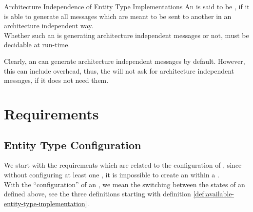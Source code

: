 \documentclass[a4paper, 12pt]{book}
\begin{document}
\begin{definition*}{Architecture Independence of Entity Type Implementations}
  An  is said to be , if it is able to generate all messages which are meant to be
  sent to another  in an architecture independent
  way.\\
  Whether such an  is generating architecture
  independent messages or not, must be decidable at run-time.
\end{definition*}
Clearly, an  can generate architecture
independent messages by default. However, this can include overhead, thus, the
\SYNEIGHT will not ask for architecture independent messages, if it does
not need them.


\section{Requirements}
\label{sec:esr-requirements}

\subsection{Entity Type Configuration}
\label{sec:entity-type-representation:req:entity-type-configuration}

We start with the requirements which are related to the configuration of
, since without configuring at least one
, it is impossible to create an 
within a .\\
%
With the ``configuration'' of an , we mean the
switching between the states of an  defined
above, see the three definitions starting with definition
\vref{def:available-entity-type-implementation}. 
\end{document}
